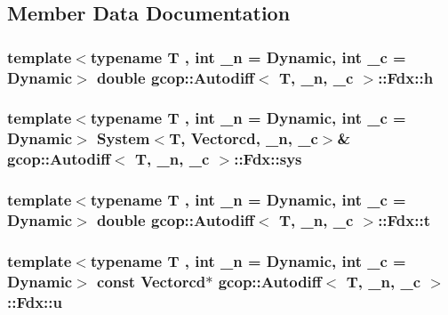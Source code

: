 \subsection{\-Member \-Data \-Documentation}
\subsubsection[{h}]{\setlength{\rightskip}{0pt plus 5cm}template$<$typename T , int \-\_\-n = \-Dynamic, int \-\_\-c = \-Dynamic$>$ double {\bf gcop\-::\-Autodiff}$<$ \-T, \-\_\-n, \-\_\-c $>$\-::{\bf \-Fdx\-::h}}\label{structgcop_1_1Autodiff_1_1Fdx_a93d276664f9a45f3dbff7bd092cf44d2}
\subsubsection[{sys}]{\setlength{\rightskip}{0pt plus 5cm}template$<$typename T , int \-\_\-n = \-Dynamic, int \-\_\-c = \-Dynamic$>$ {\bf \-System}$<$\-T, {\bf \-Vectorcd}, \-\_\-n, \-\_\-c$>$\& {\bf gcop\-::\-Autodiff}$<$ \-T, \-\_\-n, \-\_\-c $>$\-::{\bf \-Fdx\-::sys}}\label{structgcop_1_1Autodiff_1_1Fdx_adbb342c539003ddbd4cd0acee3427fa4}
\subsubsection[{t}]{\setlength{\rightskip}{0pt plus 5cm}template$<$typename T , int \-\_\-n = \-Dynamic, int \-\_\-c = \-Dynamic$>$ double {\bf gcop\-::\-Autodiff}$<$ \-T, \-\_\-n, \-\_\-c $>$\-::{\bf \-Fdx\-::t}}\label{structgcop_1_1Autodiff_1_1Fdx_a6352da98893423b98b6c9493c6b92264}
\subsubsection[{u}]{\setlength{\rightskip}{0pt plus 5cm}template$<$typename T , int \-\_\-n = \-Dynamic, int \-\_\-c = \-Dynamic$>$ const {\bf \-Vectorcd}$\ast$ {\bf gcop\-::\-Autodiff}$<$ \-T, \-\_\-n, \-\_\-c $>$\-::{\bf \-Fdx\-::u}}\label{structgcop_1_1Autodiff_1_1Fdx_a44bd420b87be15d29592045415783ae0}
